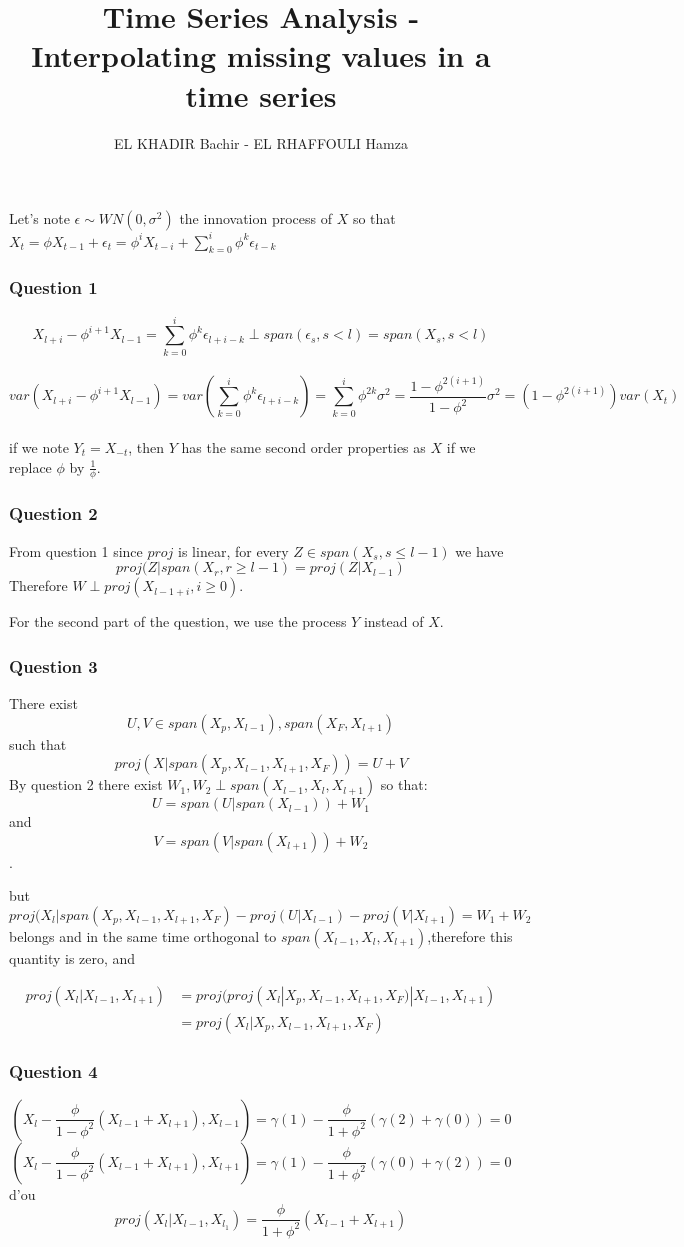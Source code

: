\documentclass[12pt,french]{article}
\newcommand{\Q}[1]{\subsubsection*{Question #1}}
\begin{document}
\title{Time Series Analysis - Interpolating missing values in a time series}
\author{EL KHADIR Bachir - EL RHAFFOULI Hamza}


\maketitle
\newpage
\tableofcontents
\newpage

Let's note $\epsilon \sim WN(0, \sigma^2)$ the innovation process of $X$ so that $X_t = \phi X_{t-1} + \epsilon_t = \phi^i X_{t-i} + \sum_{k=0}^i \phi^k \epsilon_{t-k}$

\Q{1}
$$X_{l+i} - \phi^{i+1}X_{l-1} = \sum_{k=0}^{i} \phi^k \epsilon_{l+i-k} \perp span(\epsilon_s, s < l) = span(X_s, s < l)$$ \\
$$var(X_{l+i} - \phi^{i+1}X_{l-1}) = var(\sum_{k=0}^{i} \phi^k \epsilon_{l+i-k}) = \sum_{k=0}^{i} \phi^{2k} \sigma^2 = \frac{1-\phi^{2(i+1)}}{1-\phi^2} \sigma^2 = (1-\phi^{2(i+1)}) var(X_t)$$ \\
if we note $Y_t = X_{-t}$, then $Y$ has the same second order properties as $X$ if we replace $\phi$ by $\frac{1}{\phi}$.

\Q{2}
From question 1 since $proj$ is linear, for every $Z \in span(X_s, s \leq l-1)$ we have $$proj(Z | span(X_r, r \geq l-1) = proj(Z | X_{l-1})$$
Therefore $W \perp proj(X_{l-1+i}, i \geq 0)$.

For the second part of the question, we use the process $Y$ instead of $X$.

\Q{3}
There exist $$U, V \in span(X_p, X_{l-1}), span(X_F, X_{l+1})$$
such that $$proj(X|span(X_p, X_{l-1}, X_{l+1}, X_F)) = U + V$$
By question 2 there exist $W_1, W_2 \perp span(X_{l-1}, X_l, X_{l+1})$ so that:
$$U = span(U|span(X_{l-1})) + W_1$$ and
$$V = span(V|span(X_{l+1})) + W_2$$ .

but $$proj(X_l|span(X_p, X_{l-1}, X_{l+1}, X_F) - proj(U|X_{l-1}) - proj(V|X_{l+1}) = W_1 + W_2$$
belongs and in the same time orthogonal to $span(X_{l-1}, X_l, X_{l+1})$,therefore this quantity is zero, and


\begin{align*}
  proj(X_l | X_{l-1}, X_{l+1}) &= proj(proj(X_l| X_p, X_{l-1}, X_{l+1}, X_F) | X_{l-1}, X_{l+1}) \\
&= proj(X_l| X_p, X_{l-1}, X_{l+1}, X_F)
\end{align*}
  
\Q{4}

$$ (X_l - \frac{\phi}{1-\phi^2} (X_{l-1}+X_{l+1}), X_{l-1}) = \gamma(1) - \frac{\phi}{1+\phi^2} (\gamma(2)+\gamma(0)) = 0$$
$$ (X_l - \frac{\phi}{1-\phi^2} (X_{l-1}+X_{l+1}), X_{l+1}) = \gamma(1) - \frac{\phi}{1+\phi^2} (\gamma(0)+\gamma(2)) = 0$$
d'ou
$$ proj(X_l|X_{l-1}, X_{l_1})=\frac{\phi}{1+\phi^2} (X_{l-1}+X_{l+1})$$
\end{document}
